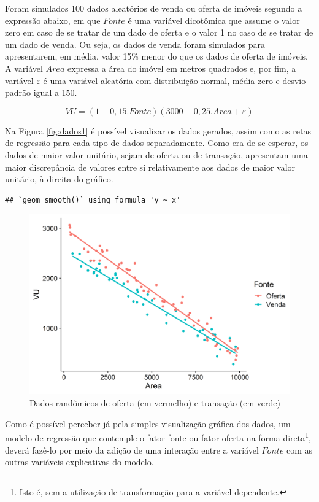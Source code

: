 \documentclass{article}
\begin{document}
Foram simulados 100 dados aleatórios de venda ou oferta de imóveis
segundo a expressão abaixo, em que \(Fonte\) é uma variável dicotômica
que assume o valor zero em caso de se tratar de um dado de oferta e o
valor 1 no caso de se tratar de um dado de venda. Ou seja, os dados de
venda foram simulados para apresentarem, em média, valor 15\% menor do
que os dados de oferta de imóveis. A variável \(Area\) expressa a área
do imóvel em metros quadrados e, por fim, a variável \(\varepsilon\) é
uma variável aleatória com distribuição normal, média zero e desvio
padrão igual a 150.

\[VU = (1 - 0,15.Fonte)(3000 - 0,25.Area + \varepsilon)\]

Na Figura \ref{fig:dados1} é possível visualizar os dados gerados, assim
como as retas de regressão para cada tipo de dados separadamente. Como
era de se esperar, os dados de maior valor unitário, sejam de oferta ou
de transação, apresentam uma maior discrepância de valores entre si
relativamente aos dados de maior valor unitário, à direita do gráfico.

\begin{verbatim}
## `geom_smooth()` using formula 'y ~ x'
\end{verbatim}

\begin{figure}
\centering
\includegraphics{./images/dados1-1.png}
\caption{Dados randômicos de oferta (em vermelho) e transação (em
verde)}
\end{figure}

Como é possível perceber já pela simples visualização gráfica dos dados,
um modelo de regressão que contemple o fator fonte ou fator oferta na
forma direta\footnote{Isto é, sem a utilização de transformação para a
  variável dependente.}, deverá fazê-lo por meio da adição de uma
interação entre a variável \(Fonte\) com as outras variáveis
explicativas do modelo.
\end{document}
